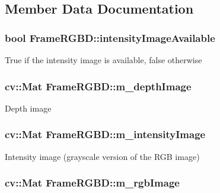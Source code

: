 \subsection{\-Member \-Data \-Documentation}
\hypertarget{classFrameRGBD_a64089c164be4f0622a057565a4a2e773}{
\subsubsection[{intensity\-Image\-Available}]{\setlength{\rightskip}{0pt plus 5cm}bool {\bf \-Frame\-R\-G\-B\-D\-::intensity\-Image\-Available}}}\label{classFrameRGBD_a64089c164be4f0622a057565a4a2e773}
\-True if the intensity image is available, false otherwise \hypertarget{classFrameRGBD_a69ab9787e03769e06403d71169b531d6}{
\subsubsection[{m\-\_\-depth\-Image}]{\setlength{\rightskip}{0pt plus 5cm}cv\-::\-Mat {\bf \-Frame\-R\-G\-B\-D\-::m\-\_\-depth\-Image}}}\label{classFrameRGBD_a69ab9787e03769e06403d71169b531d6}
\-Depth image \hypertarget{classFrameRGBD_a4118364759fedf2c412941499a2f3a44}{
\subsubsection[{m\-\_\-intensity\-Image}]{\setlength{\rightskip}{0pt plus 5cm}cv\-::\-Mat {\bf \-Frame\-R\-G\-B\-D\-::m\-\_\-intensity\-Image}}}\label{classFrameRGBD_a4118364759fedf2c412941499a2f3a44}
\-Intensity image (grayscale version of the \-R\-G\-B image) \hypertarget{classFrameRGBD_ae3934db98bc05f37dc289b7c4c7e14d2}{
\subsubsection[{m\-\_\-rgb\-Image}]{\setlength{\rightskip}{0pt plus 5cm}cv\-::\-Mat {\bf \-Frame\-R\-G\-B\-D\-::m\-\_\-rgb\-Image}}}\label{classFrameRGBD_ae3934db98bc05f37dc289b7c4c7e14d2}
